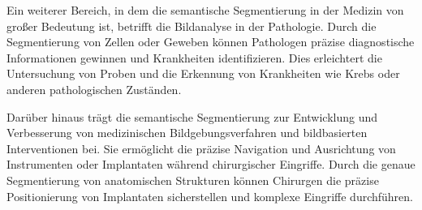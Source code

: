 Ein weiterer Bereich, in dem die semantische Segmentierung in der Medizin von
großer Bedeutung ist, betrifft die Bildanalyse in der Pathologie. Durch die
Segmentierung von Zellen oder Geweben können Pathologen präzise diagnostische
Informationen gewinnen und Krankheiten identifizieren. Dies erleichtert die
Untersuchung von Proben und die Erkennung von Krankheiten wie Krebs oder
anderen pathologischen Zuständen.

Darüber hinaus trägt die semantische Segmentierung zur Entwicklung und
Verbesserung von medizinischen Bildgebungsverfahren und bildbasierten
Interventionen bei. Sie ermöglicht die präzise Navigation und Ausrichtung von
Instrumenten oder Implantaten während chirurgischer Eingriffe. Durch die genaue
Segmentierung von anatomischen Strukturen können Chirurgen die präzise
Positionierung von Implantaten sicherstellen und komplexe Eingriffe
durchführen.
